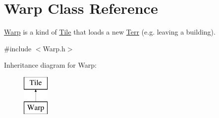 \hypertarget{class_warp}{}\section{Warp Class Reference}
\label{class_warp}


\hyperlink{class_warp}{Warp} is a kind of \hyperlink{class_tile}{Tile} that loads a new \hyperlink{class_terr}{Terr} (e.\+g. leaving a building).  




{\ttfamily \#include $<$Warp.\+h$>$}

Inheritance diagram for Warp\+:\begin{figure}[H]
\begin{center}
\leavevmode
\includegraphics[height=2.000000cm]{class_warp}
\end{center}
\end{figure}
